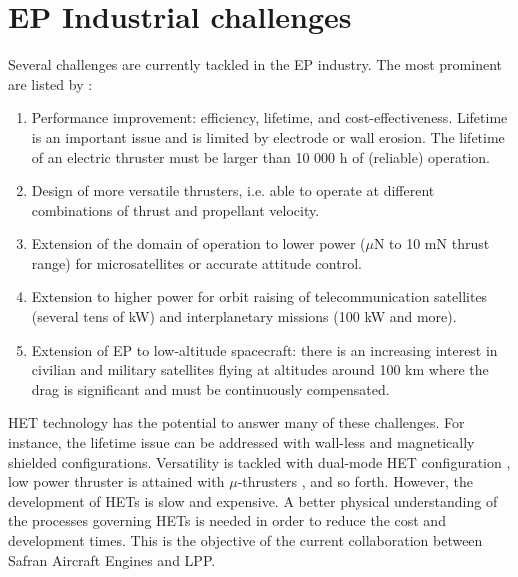 
\section{EP Industrial challenges}
\label{sec-challenges}

Several challenges are currently tackled in the \ac{EP} industry.
The most prominent are listed by \citet{samukawa2012}\string:
\begin{enumerate}
  \item Performance improvement\string: efficiency, lifetime, and cost-effectiveness.
   Lifetime is an important issue and is limited by electrode or wall erosion.
   The lifetime of an electric thruster must be larger than 10 000 h of (reliable) operation.
   \item  Design of more versatile thrusters, i.e. able to operate at different combinations of thrust and propellant velocity.
   \item  Extension of the domain of operation to lower power ($\mu$N to 10 mN thrust range) for microsatellites or accurate attitude control.
   \item  Extension to higher power for orbit raising of telecommunication satellites (several tens of kW) and    interplanetary missions (100 kW and more).
   \item Extension of EP to low-altitude spacecraft\string: there is an increasing interest in civilian and military satellites flying  at altitudes around 100 km where the drag is significant and must be continuously compensated.
\end{enumerate}

\ac{HET} technology has the potential to answer many of these challenges.
For instance, the lifetime issue can be addressed with wall-less and magnetically shielded configurations.
Versatility is tackled with dual-mode \ac{HET} configuration \citep{boniface2017}, low power thruster is attained with $\mu$-thrusters \citep{lascombes2018}, and so forth.
However, the development of \ac{HET}s is slow and expensive. 
A better physical understanding of the processes governing \ac{HET}s is needed in order to reduce the cost and development times.
This is the objective of the current collaboration between Safran Aircraft Engines and \ac{LPP}.

